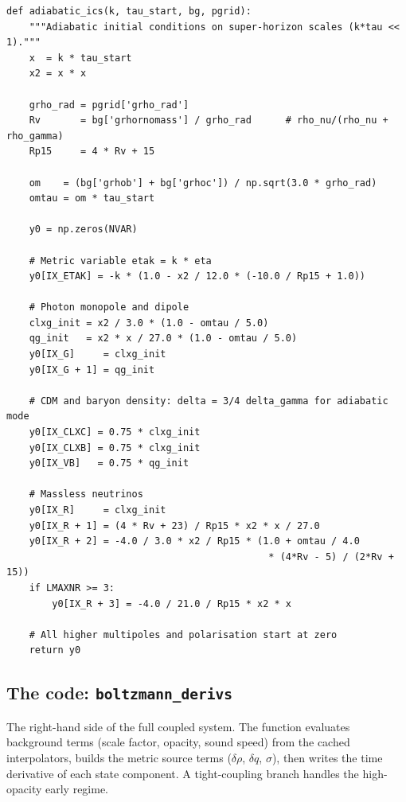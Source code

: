 \begin{codebox}
\begin{lstlisting}[style=python]
def adiabatic_ics(k, tau_start, bg, pgrid):
    """Adiabatic initial conditions on super-horizon scales (k*tau << 1)."""
    x  = k * tau_start
    x2 = x * x

    grho_rad = pgrid['grho_rad']
    Rv       = bg['grhornomass'] / grho_rad      # rho_nu/(rho_nu + rho_gamma)
    Rp15     = 4 * Rv + 15

    om    = (bg['grhob'] + bg['grhoc']) / np.sqrt(3.0 * grho_rad)
    omtau = om * tau_start

    y0 = np.zeros(NVAR)

    # Metric variable etak = k * eta
    y0[IX_ETAK] = -k * (1.0 - x2 / 12.0 * (-10.0 / Rp15 + 1.0))

    # Photon monopole and dipole
    clxg_init = x2 / 3.0 * (1.0 - omtau / 5.0)
    qg_init   = x2 * x / 27.0 * (1.0 - omtau / 5.0)
    y0[IX_G]     = clxg_init
    y0[IX_G + 1] = qg_init

    # CDM and baryon density: delta = 3/4 delta_gamma for adiabatic mode
    y0[IX_CLXC] = 0.75 * clxg_init
    y0[IX_CLXB] = 0.75 * clxg_init
    y0[IX_VB]   = 0.75 * qg_init

    # Massless neutrinos
    y0[IX_R]     = clxg_init
    y0[IX_R + 1] = (4 * Rv + 23) / Rp15 * x2 * x / 27.0
    y0[IX_R + 2] = -4.0 / 3.0 * x2 / Rp15 * (1.0 + omtau / 4.0
                                              * (4*Rv - 5) / (2*Rv + 15))
    if LMAXNR >= 3:
        y0[IX_R + 3] = -4.0 / 21.0 / Rp15 * x2 * x

    # All higher multipoles and polarisation start at zero
    return y0
\end{lstlisting}
\end{codebox}

\subsection{The code: \texttt{boltzmann\_derivs}}

The right-hand side of the full coupled system. The function evaluates background terms (scale factor, opacity, sound speed) from the cached interpolators, builds the metric source terms ($\delta\rho$, $\delta q$, $\sigma$), then writes the time derivative of each state component. A tight-coupling branch handles the high-opacity early regime.

